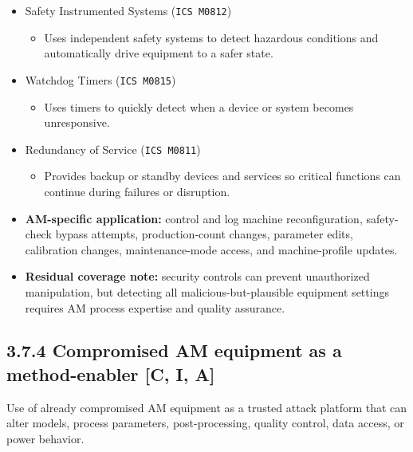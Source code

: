 \documentclass[10pt,a4paper,oneside]{report}
\begin{document}
\begin{itemize}
\begin{itemize}
\begin{itemize}
\item Uses physical or mechanical protection layers, such as interlocks or safety devices, to prevent damage or harm.
\end{itemize}
\item Safety Instrumented Systems (\texttt{ICS M0812})
\begin{itemize}
\item Uses independent safety systems to detect hazardous conditions and automatically drive equipment to a safer state.
\end{itemize}
\item Watchdog Timers (\texttt{ICS M0815})
\begin{itemize}
\item Uses timers to quickly detect when a device or system becomes unresponsive.
\end{itemize}
\item Redundancy of Service (\texttt{ICS M0811})
\begin{itemize}
\item Provides backup or standby devices and services so critical functions can continue during failures or disruption.
\end{itemize}
\end{itemize}
\end{itemize}

\begin{itemize}
\item \textbf{AM-specific application:} control and log machine reconfiguration, safety-check bypass attempts, production-count changes, parameter edits, calibration changes, maintenance-mode access, and machine-profile updates.
\end{itemize}

\begin{itemize}
\item \textbf{Residual coverage note:} security controls can prevent unauthorized manipulation, but detecting all malicious-but-plausible equipment settings requires AM process expertise and quality assurance.
\end{itemize}


\subsection{3.7.4 Compromised AM equipment as a method-enabler [C, I, A]}


Use of already compromised AM equipment as a trusted attack platform that can alter models, process parameters, post-processing, quality control, data access, or power behavior.
\end{document}
